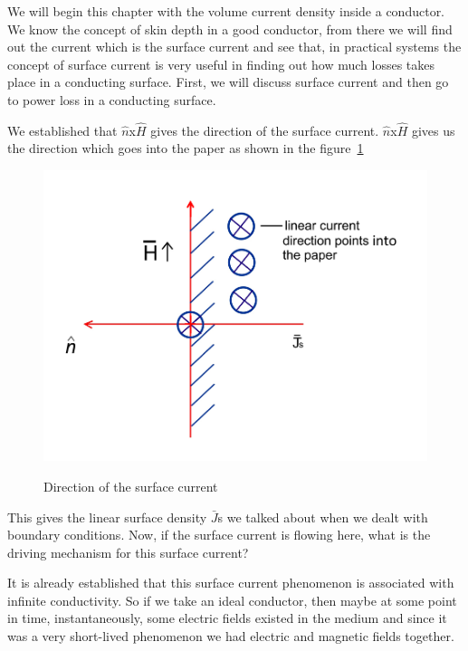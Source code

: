 We will begin this chapter with the volume current density inside a conductor. We know the concept of skin depth in a good conductor, from there we will find out the current which is the surface current and see that, in practical systems the concept of surface current is very useful in finding out how much losses takes place in a conducting surface. First, we will discuss surface current and then go to power loss in a conducting surface.

We established that $\hat{n}$x$\hat{H}$ gives the direction of the surface current. $\hat{n}$x$\hat{H}$ gives us the direction which goes into the paper as shown in the figure~\ref{fig:direction_of_surface_current}
\begin{figure}[h]
\centering
\textsc{\includegraphics[width=1\linewidth]{graphics/surface_current_direction}}
\caption{Direction of the surface current}
\label{fig:direction_of_surface_current}
\end{figure}

This gives the linear surface density $\bar{J}$s we talked about when we dealt with boundary conditions. Now, if the surface current is flowing here, what is the driving mechanism for this surface current?

It is already established that this surface current phenomenon is associated with infinite conductivity. So if we take an ideal conductor, then maybe at some point in time, instantaneously, some electric fields existed in the medium and since it was a very short-lived phenomenon we had electric and magnetic fields together.

